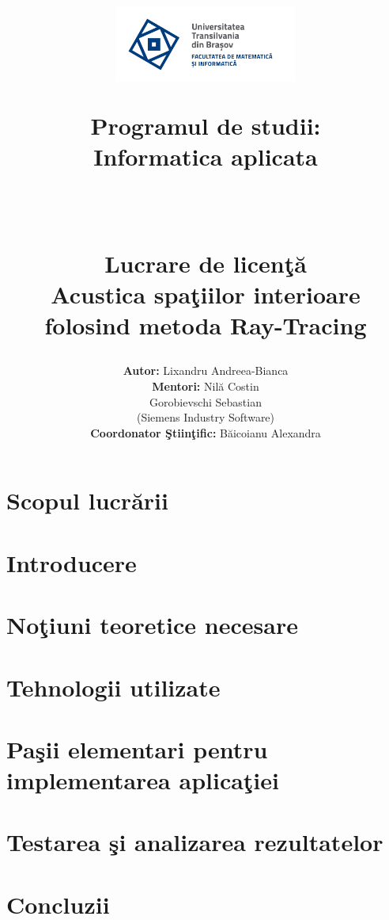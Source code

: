 \documentclass[12pt, a4paper]{report} %
\title{\begin{minipage} {0.3\textwidth}
		{{\includegraphics[width=6cm]{imagini/sigla.png} }}%
	\end{minipage}
	\hfill
	\begin{minipage}{0.3\textwidth}
		\fontsize{10pt}{6pt}\selectfont
			Programul de studii:\\
			Informatica aplicata\\
	\end{minipage}
	\vspace*{7\baselineskip}\\
	\begin{center}
			\fontsize{22pt}{6pt}\selectfont
		\bf Lucrare de licen\c{t}\u{a}\\
		\vspace{5mm}
		Acustica spa\c{t}iilor interioare folosind metoda Ray-Tracing
		\vspace*{30\baselineskip}
	\end{center}
	}
\author{\fontsize{15pt}{6pt}\selectfont
	{\bf Autor:} \hspace{5.1cm}Lixandru Andreea-Bianca\\
	\vspace{3mm}
	{\bf Mentori:} \hspace{4.6cm}Nil\u{a} Costin\\
	\vspace{3mm}
	\hspace{7cm}Gorobievschi Sebastian\\
	\vspace{3mm}
	\hspace{7cm}(Siemens Industry Software)\\
	\vspace{3mm}
	{\bf Coordonator \c{S}tiin\c{t}ific:} \hspace{1cm} B\u{a}icoianu Alexandra}
\date{\begin{center} Bra\c{s}ov, 2021 \end{center}}
\makeatletter
\renewcommand{\maketitle}{\bgroup\setlength{\parindent}{0pt}
	\begin{flushleft}
		\textbf{\@title}
		
		\@author
		
		\vspace{10mm}
		\@date
	\end{flushleft}\egroup
}
\makeatother
\begin{document}
	
	\maketitle	
	\thispagestyle{empty} %
	
	\newpage
	\tableofcontents
	\thispagestyle{empty}

		
	
	\chapter*{Scopul lucr\u arii}
		
		
	\chapter*{Introducere}
		
	\chapter{No\c{t}iuni teoretice necesare}
		
	\chapter{Tehnologii utilizate}
		
	\chapter{Pa\c{s}ii elementari pentru implementarea aplica\c{t}iei}
			
	\chapter{Testarea \c{s}i analizarea rezultatelor}
		
	\chapter{Concluzii}
		
	
	
	\newpage
	
\end{document}
